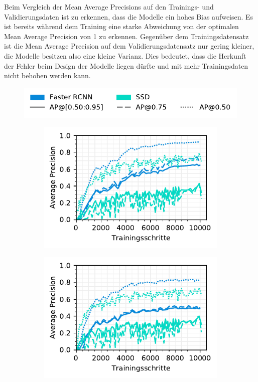Beim Vergleich der Mean Average Precisions auf den Trainings- und Validierungsdaten ist zu erkennen, dass die Modelle ein hohes Bias aufweisen. Es ist bereits während dem Training eine starke Abweichung von der optimalen Mean Average Precision von 1 zu erkennen. Gegenüber dem Trainingsdatensatz ist die Mean Average Precision auf dem Validierungsdatensatz nur gering kleiner, die Modelle besitzen also eine kleine Varianz. Dies bedeutet, dass die Herkunft der Fehler beim Design der Modelle liegen dürfte und mit mehr Trainingsdaten nicht behoben werden kann. 

\begin{figure}[H]
  \captionsetup{width=.9\linewidth}
  \caption{Average Precision auf den Trainings- und Validierungsdaten des Faster-RCNN und SSD Modells}
  \label{fig:3ap-map}
  \centering
  \includegraphics[scale=1]{graphics/matplot/img-detection__legend_3.pdf}
  \begin{subfigure}[t]{0.5\linewidth}
    \centering
    \includegraphics[scale=1]{graphics/matplot/img-detection__all__ap__train.pdf}
    \label{fig:3ap-map:map_train}
    \vspace{2ex}
  \end{subfigure}%
  \begin{subfigure}[t]{0.5\linewidth}
    \centering
    \includegraphics[scale=1]{graphics/matplot/img-detection__all__ap.pdf}

\end{subfigure}
\end{figure}
